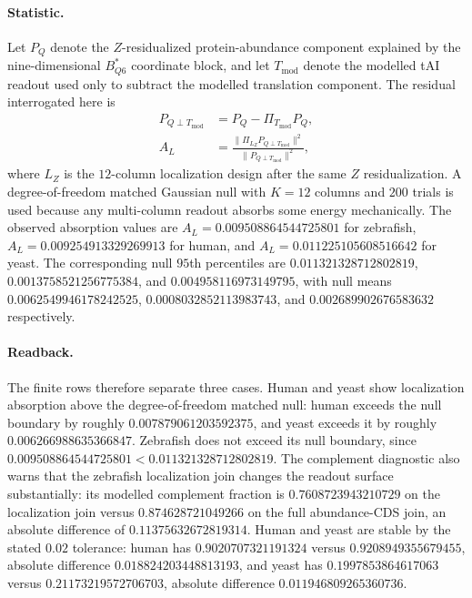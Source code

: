 \paragraph{Statistic.}
Let $P_Q$ denote the $Z$-residualized protein-abundance component explained by the nine-dimensional $B^*_{Q6}$ coordinate block, and let $T_{\mathrm{mod}}$ denote the modelled tAI readout used only to subtract the modelled translation component.  The residual interrogated here is
$$
\begin{aligned}
P_{Q\perp T_{\mathrm{mod}}} &= P_Q - \Pi_{T_{\mathrm{mod}}} P_Q,\\
A_L &= \frac{\|\Pi_{L_Z}P_{Q\perp T_{\mathrm{mod}}}\|^2}{\|P_{Q\perp T_{\mathrm{mod}}}\|^2},
\end{aligned}
$$
where $L_Z$ is the $12$-column localization design after the same $Z$ residualization.  A degree-of-freedom matched Gaussian null with $K=12$ columns and $200$ trials is used because any multi-column readout absorbs some energy mechanically.  The observed absorption values are $A_L=0.009508864544725801$ for zebrafish, $A_L=0.009254913329269913$ for human, and $A_L=0.011225105608516642$ for yeast.  The corresponding null $95$th percentiles are $0.011321328712802819$, $0.0013758521256775384$, and $0.004958116973149795$, with null means $0.0062549946178242525$, $0.0008032852113983743$, and $0.002689902676583632$ respectively.

\paragraph{Readback.}
The finite rows therefore separate three cases.  Human and yeast show localization absorption above the degree-of-freedom matched null: human exceeds the null boundary by roughly $0.007879061203592375$, and yeast exceeds it by roughly $0.006266988635366847$.  Zebrafish does not exceed its null boundary, since $0.009508864544725801<0.011321328712802819$.  The complement diagnostic also warns that the zebrafish localization join changes the readout surface substantially: its modelled complement fraction is $0.7608723943210729$ on the localization join versus $0.874628721049266$ on the full abundance-CDS join, an absolute difference of $0.11375632672819314$.  Human and yeast are stable by the stated $0.02$ tolerance: human has $0.9020707321191324$ versus $0.9208949355679455$, absolute difference $0.018824203448813193$, and yeast has $0.1997853864617063$ versus $0.21173219572706703$, absolute difference $0.011946809265360736$.

